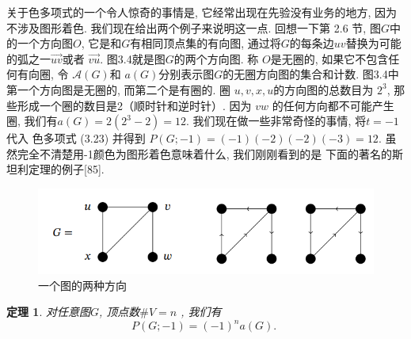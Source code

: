 \documentclass[a4paper,12pt]{ctexbook}
\newtheorem{theorem}[lemma]{\hspace{2em}定理}%
\begin{document}
关于色多项式的一个令人惊奇的事情是, 它经常出现在先验没有业务的地方, 因为不涉及图形着色. 我们现在给出两个例子来说明这一点. 回想一下第 2.6 节, 图$G$中的一个方向图$O$, 它是和$G$有相同顶点集的有向图, 通过将$G$的每条边$u v$替换为可能的弧之一$\overrightarrow{u v}$或者 $\overrightarrow{v u}$. 图3.4就是图$G$的两个方向图. 称 $O$是无圈的, 如果它不包含任何有向圈, 令 $\mathcal{A}(G)$和 $a(G)$分别表示图$G$的无圈方向图的集合和计数.  图3.4中第一个方向图是无圈的, 而第二个是有圈的. 圈 $u, v, x, u$的方向图的总数目为 $2^{3}$, 那些形成一个圈的数目是2（顺时针和逆时针）. 因为  $v w$ 的任何方向都不可能产生圈, 我们有$a(G)=2\left(2^{3}-2\right)=12$. 我们现在做一些非常奇怪的事情, 将$t=-1$代入
色多项式 (3.23) 并得到 $P(G ;-1)=(-1)(-2)(-2)(-3)=12$. 虽然完全不清楚用-1颜色为图形着色意味着什么, 我们刚刚看到的是
下面的著名的斯坦利定理的例子[85].
\begin{figure}[h]
	\centering
	\includegraphics[width=0.8\linewidth]{./fig3/3-4.png}
	\caption{\label{chapter} 一个图的两种方向}
\end{figure}
\begin{theorem}
	对任意图$G$, 顶点数$\# V=n$ , 我们有$$
	P(G ;-1)=(-1)^{n} a(G) \text {. }
	$$
\end{theorem}
\end{document}
